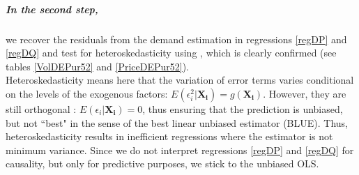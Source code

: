 

\subparagraph{In the second step,} 
\label{secondstepresiduals}


we recover the residuals from the demand estimation in regressions \ref{regDP} and \ref{regDQ} and test for heteroskedasticity using \cite{white1980heteroskedasticity}, which is clearly confirmed (see tables \ref{VolDEPur52} and \ref{PriceDEPur52}). \\

Heteroskedasticity means here that the variation of error terms varies conditional on the levels of the exogenous factors: $E(\epsilon_i^2 \vert \boldsymbol{X_i})=g(\boldsymbol{X_i})$. However, they are still orthogonal%
: $E(\epsilon_i \vert \boldsymbol{X_i})=0$, thus ensuring that the prediction is unbiased, but not ``best" in the sense of the best linear unbiased estimator (BLUE). Thus, heteroskedasticity results in inefficient regressions where the estimator is not minimum variance. 
Since we do not interpret regressions \ref{regDP} and \ref{regDQ} for causality, but only for predictive purposes, we stick to the unbiased OLS. \\

